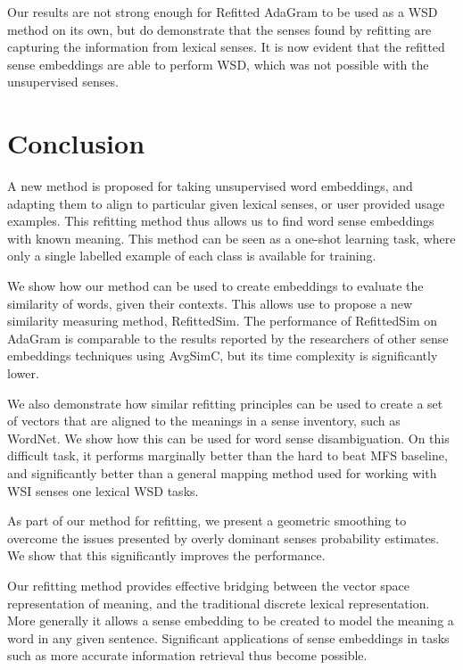 \documentclass{article}
\begin{document}
Our results are not strong enough for Refitted AdaGram to be used as a WSD method on its own, but do demonstrate that the senses found by refitting are capturing the information from lexical senses.  It is now evident that the refitted sense embeddings are able to perform WSD, which was not possible with the unsupervised senses. 

\section{Conclusion}\label{conclusion}

A new method is proposed for taking unsupervised word embeddings, and adapting them to align to particular given lexical senses, or user provided usage examples. 
This refitting method thus allows us to find word sense embeddings with known meaning.
This method can be seen as a one-shot learning task, where only a single labelled example of each class is available for training.

We show how our method can be used to create embeddings to evaluate the similarity of words, given their contexts.
This allows use to propose a new similarity measuring method, RefittedSim.
The performance of RefittedSim on AdaGram is comparable to the results reported by the researchers of other sense embeddings techniques using AvgSimC, but its time complexity is significantly lower.

We also demonstrate how similar refitting principles can be used to create a set of vectors that are aligned to the meanings in a sense inventory, such as WordNet. We show how this can be used for word sense disambiguation.
On this difficult task, it performs marginally better than the hard to beat MFS baseline, and significantly better than a general mapping method used for working with WSI senses one lexical WSD tasks.

As part of our method for refitting, we present a geometric smoothing to overcome the issues presented by overly dominant senses probability estimates.
We show that this significantly improves the performance.

Our refitting method provides effective bridging between the vector space representation of meaning, and the traditional discrete lexical representation.
More generally it allows a sense embedding to be created to model the meaning a word in any given sentence. Significant applications  of sense embeddings in tasks such as more accurate information retrieval thus become possible.


\clearpage
{}


\end{document}
